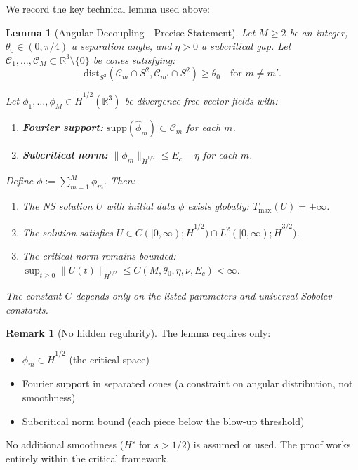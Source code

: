 \documentclass[11pt]{article}
\newtheorem{lemma}[theorem]{Lemma}
\theoremstyle{definition}
\newtheorem{remark}[theorem]{Remark}
\newcommand{\R}{\mathbb{R}}
\begin{document}
We record the key technical lemma used above:

\begin{lemma}[Angular Decoupling---Precise Statement]\label{lem:decoupling}
Let $M \geq 2$ be an integer, $\theta_0 \in (0, \pi/4)$ a separation angle, and $\eta > 0$ a subcritical gap. Let $\mathcal{C}_1, \ldots, \mathcal{C}_M \subset \R^3 \setminus \{0\}$ be cones satisfying:
\begin{equation}
\text{dist}_{S^2}(\mathcal{C}_m \cap S^2, \mathcal{C}_{m'} \cap S^2) \geq \theta_0 \quad \text{for } m \neq m'.
\end{equation}

Let $\phi_1, \ldots, \phi_M \in \dot{H}^{1/2}(\R^3)$ be divergence-free vector fields with:
\begin{enumerate}
\item[(H1)] \textbf{Fourier support:} $\text{supp}(\hat{\phi}_m) \subset \mathcal{C}_m$ for each $m$.
\item[(H2)] \textbf{Subcritical norm:} $\|\phi_m\|_{\dot{H}^{1/2}} \leq E_c - \eta$ for each $m$.
\end{enumerate}

Define $\phi := \sum_{m=1}^M \phi_m$. Then:
\begin{enumerate}
\item[(C1)] The NS solution $U$ with initial data $\phi$ exists globally: $T_{\max}(U) = +\infty$.
\item[(C2)] The solution satisfies $U \in C([0,\infty); \dot{H}^{1/2}) \cap L^2([0,\infty); \dot{H}^{3/2})$.
\item[(C3)] The critical norm remains bounded: $\sup_{t \geq 0} \|U(t)\|_{\dot{H}^{1/2}} \leq C(M, \theta_0, \eta, \nu, E_c) < \infty$.
\end{enumerate}

The constant $C$ depends only on the listed parameters and universal Sobolev constants.
\end{lemma}

\begin{remark}[No hidden regularity]
The lemma requires only:
\begin{itemize}
\item $\phi_m \in \dot{H}^{1/2}$ (the critical space)
\item Fourier support in separated cones (a constraint on angular distribution, not smoothness)
\item Subcritical norm bound (each piece below the blow-up threshold)
\end{itemize}
No additional smoothness ($H^s$ for $s > 1/2$) is assumed or used. The proof works entirely within the critical framework.
\end{remark}
\end{document}
